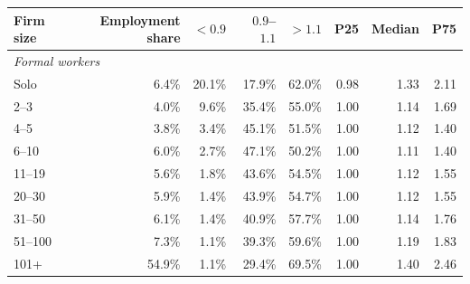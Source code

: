 \begin{tabular}{lrrrrrrr}
\toprule
    Firm size & Employment share & $<0.9$ & $0.9$--$1.1$ & $>1.1$ & P25 & Median & P75 \\
    \midrule
\multicolumn{8}{l}{\textit{Formal workers}} \\
Solo & 6.4\% & 20.1\% & 17.9\% & 62.0\% & 0.98 & 1.33 & 2.11 \\
2--3 & 4.0\% & 9.6\% & 35.4\% & 55.0\% & 1.00 & 1.14 & 1.69 \\
4--5 & 3.8\% & 3.4\% & 45.1\% & 51.5\% & 1.00 & 1.12 & 1.40 \\
6--10 & 6.0\% & 2.7\% & 47.1\% & 50.2\% & 1.00 & 1.11 & 1.40 \\
11--19 & 5.6\% & 1.8\% & 43.6\% & 54.5\% & 1.00 & 1.12 & 1.55 \\
20--30 & 5.9\% & 1.4\% & 43.9\% & 54.7\% & 1.00 & 1.12 & 1.55 \\
31--50 & 6.1\% & 1.4\% & 40.9\% & 57.7\% & 1.00 & 1.14 & 1.76 \\
51--100 & 7.3\% & 1.1\% & 39.3\% & 59.6\% & 1.00 & 1.19 & 1.83 \\
101+ & 54.9\% & 1.1\% & 29.4\% & 69.5\% & 1.00 & 1.40 & 2.46\\
\bottomrule\end{tabular}
